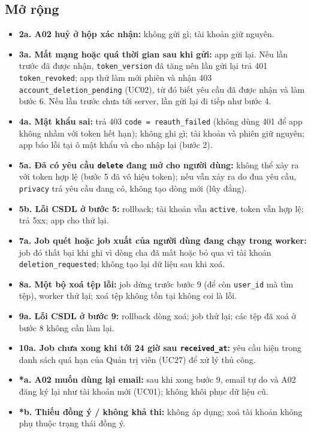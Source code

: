 \subsection{Mở rộng}
\begin{itemize}
\item \textbf{2a. A02 huỷ ở hộp xác nhận:} không gửi gì; tài khoản giữ nguyên.
\item \textbf{3a. Mất mạng hoặc quá thời gian sau khi gửi:} app gửi lại. Nếu lần trước đã được nhận, {\small\texttt{token\_\allowbreak{}\allowbreak{}version}} đã tăng nên lần gửi lại trả 401 {\small\texttt{token\_\allowbreak{}\allowbreak{}revoked}}; app thử làm mới phiên và nhận 403 {\small\texttt{account\_\allowbreak{}\allowbreak{}deletion\_\allowbreak{}\allowbreak{}pending}} (UC02), từ đó biết yêu cầu đã được nhận và làm bước 6. Nếu lần trước chưa tới server, lần gửi lại đi tiếp như bước 4.
\item \textbf{4a. Mật khẩu sai:} trả 403 {\small\texttt{code = reauth\_\allowbreak{}\allowbreak{}failed}} (không dùng 401 để app không nhầm với token hết hạn); không ghi gì; tài khoản và phiên giữ nguyên; app báo lỗi tại ô mật khẩu và cho nhập lại (bước 2).
\item \textbf{5a. Đã có yêu cầu {\small\texttt{delete}} đang mở cho người dùng:} không thể xảy ra với token hợp lệ (bước 5 đã vô hiệu token); nếu vẫn xảy ra do đua yêu cầu, {\small\texttt{privacy}} trả yêu cầu đang có, không tạo dòng mới (lũy đẳng).
\item \textbf{5b. Lỗi CSDL ở bước 5:} rollback; tài khoản vẫn {\small\texttt{active}}, token vẫn hợp lệ; trả 5xx; app cho thử lại.
\item \textbf{7a. Job quét hoặc job xuất của người dùng đang chạy trong worker:} job đó thất bại khi ghi vì dòng cha đã mất hoặc bỏ qua vì tài khoản {\small\texttt{deletion\_\allowbreak{}\allowbreak{}requested}}; không tạo lại dữ liệu sau khi xoá.
\item \textbf{8a. Một bộ xoá tệp lỗi:} job dừng trước bước 9 (để còn {\small\texttt{user\_\allowbreak{}\allowbreak{}id}} mà tìm tệp), worker thử lại; xoá tệp không tồn tại không coi là lỗi.
\item \textbf{9a. Lỗi CSDL ở bước 9:} rollback dòng xoá; job thử lại; các tệp đã xoá ở bước 8 không cần làm lại.
\item \textbf{10a. Job chưa xong khi tới 24 giờ sau {\small\texttt{received\_\allowbreak{}\allowbreak{}at}}:} yêu cầu hiện trong danh sách quá hạn của Quản trị viên (UC27) để xử lý thủ công.
\item \textbf{*a. A02 muốn dùng lại email:} sau khi xong bước 9, email tự do và A02 đăng ký lại như tài khoản mới (UC01); không khôi phục dữ liệu cũ.
\item \textbf{*b. Thiếu đồng ý /\allowbreak{} không khả thi:} không áp dụng; xoá tài khoản không phụ thuộc trạng thái đồng ý.
\end{itemize}
